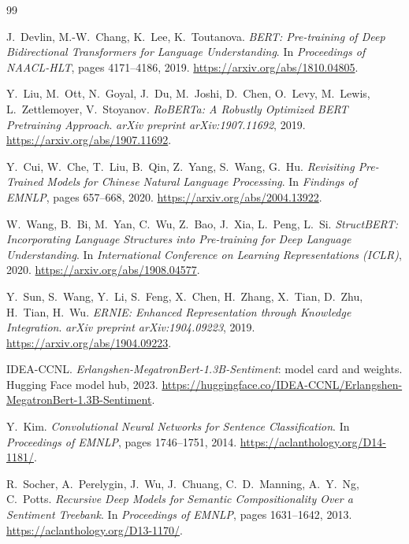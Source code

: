 \documentclass[11pt,a4paper]{article}
\begin{document}
\begin{thebibliography}{99}\small

J.~Devlin, M.-W.~Chang, K.~Lee, K.~Toutanova.
\newblock \emph{BERT: Pre-training of Deep Bidirectional Transformers for Language Understanding}.
\newblock In \emph{Proceedings of NAACL-HLT}, pages 4171--4186, 2019.
\newblock \url{https://arxiv.org/abs/1810.04805}.

Y.~Liu, M.~Ott, N.~Goyal, J.~Du, M.~Joshi, D.~Chen, O.~Levy, M.~Lewis,
L.~Zettlemoyer, V.~Stoyanov.
\newblock \emph{RoBERTa: A Robustly Optimized BERT Pretraining Approach}.
\newblock \emph{arXiv preprint arXiv:1907.11692}, 2019.
\newblock \url{https://arxiv.org/abs/1907.11692}.

Y.~Cui, W.~Che, T.~Liu, B.~Qin, Z.~Yang, S.~Wang, G.~Hu.
\newblock \emph{Revisiting Pre-Trained Models for Chinese Natural Language Processing}.
\newblock In \emph{Findings of EMNLP}, pages 657--668, 2020.
\newblock \url{https://arxiv.org/abs/2004.13922}.

W.~Wang, B.~Bi, M.~Yan, C.~Wu, Z.~Bao, J.~Xia, L.~Peng, L.~Si.
\newblock \emph{StructBERT: Incorporating Language Structures into Pre-training for Deep Language Understanding}.
\newblock In \emph{International Conference on Learning Representations (ICLR)}, 2020.
\newblock \url{https://arxiv.org/abs/1908.04577}.

Y.~Sun, S.~Wang, Y.~Li, S.~Feng, X.~Chen, H.~Zhang, X.~Tian, D.~Zhu,
H.~Tian, H.~Wu.
\newblock \emph{ERNIE: Enhanced Representation through Knowledge Integration}.
\newblock \emph{arXiv preprint arXiv:1904.09223}, 2019.
\newblock \url{https://arxiv.org/abs/1904.09223}.

IDEA-CCNL.
\newblock \emph{Erlangshen-MegatronBert-1.3B-Sentiment}: model card and weights.
\newblock Hugging Face model hub, 2023.
\newblock \url{https://huggingface.co/IDEA-CCNL/Erlangshen-MegatronBert-1.3B-Sentiment}.

Y.~Kim.
\newblock \emph{Convolutional Neural Networks for Sentence Classification}.
\newblock In \emph{Proceedings of EMNLP}, pages 1746--1751, 2014.
\newblock \url{https://aclanthology.org/D14-1181/}.

R.~Socher, A.~Perelygin, J.~Wu, J.~Chuang, C.~D.~Manning, A.~Y.~Ng, C.~Potts.
\newblock \emph{Recursive Deep Models for Semantic Compositionality Over a Sentiment Treebank}.
\newblock In \emph{Proceedings of EMNLP}, pages 1631--1642, 2013.
\newblock \url{https://aclanthology.org/D13-1170/}.


\end{thebibliography}
\end{document}
